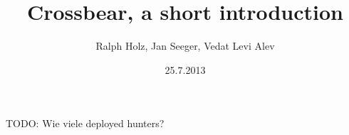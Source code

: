\documentclass[t]{beamer}
\title[Crossbear: A short introduction]{Crossbear, a short introduction}
\author[Ralph Holz, Jan Seeger, Vedat Levi Alev]{Ralph Holz, Jan Seeger, Vedat Levi Alev}
\institute{Network Architectures and Services \\ Technische Universität München}
\date{25.7.2013}
\begin{document}
\begin{frame}
  \titlepage
\end{frame}
TODO: Wie viele deployed hunters?


\end{document}
